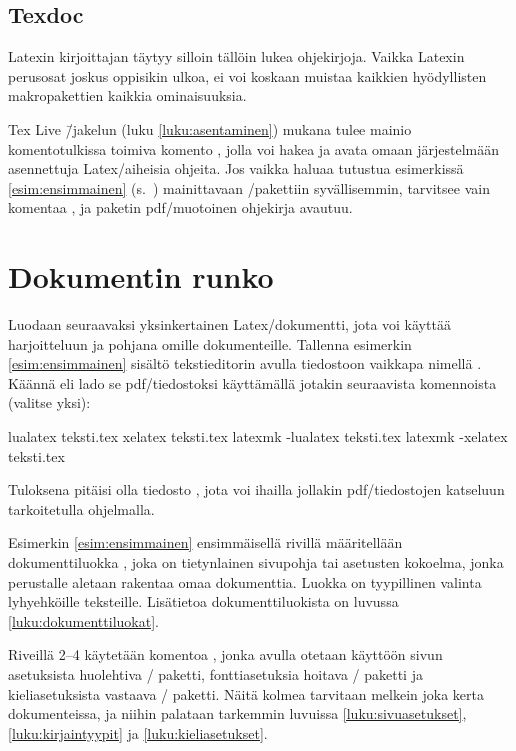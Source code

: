 \subsection{Texdoc}

Latexin kirjoittajan täytyy silloin tällöin lukea ohjekirjoja. Vaikka
Latexin perusosat joskus oppisikin ulkoa, ei voi koskaan muistaa
kaikkien hyödyllisten makropakettien kaikkia ominaisuuksia.

Tex Live \=/jakelun (luku \ref{luku:asentaminen}) mukana tulee mainio
komentotulkissa toimiva komento , jolla voi hakea ja avata
omaan järjestelmään asennettuja Latex\-/aiheisia ohjeita. Jos vaikka
haluaa tutustua esimerkissä \ref{esim:ensimmainen}
(s.~\pageref{esim:ensimmainen}) mainittavaan
\-/pakettiin syvällisemmin, tarvitsee vain komentaa
, ja paketin pdf\-/muotoinen ohjekirja avautuu.

\section{Dokumentin runko}

Luodaan seuraavaksi yksinkertainen Latex\-/dokumentti, jota voi käyttää
harjoitteluun ja pohjana omille dokumenteille. Tallenna esimerkin
\ref{esim:ensimmainen} sisältö tekstieditorin avulla tiedostoon vaikkapa
nimellä . Käännä eli lado se pdf\-/tiedostoksi
käyttämällä jotakin seuraavista komennoista (valitse yksi):

\begin{koodilohkosis}
  lualatex teksti.tex
  xelatex  teksti.tex
  latexmk -lualatex teksti.tex
  latexmk -xelatex  teksti.tex
\end{koodilohkosis}

Tuloksena pitäisi olla tiedosto , jota voi ihailla
jollakin pdf\-/tiedostojen katseluun tarkoitetulla ohjelmalla.

Esimerkin \ref{esim:ensimmainen} ensimmäisellä rivillä määritellään
dokumenttiluokka , joka on tietynlainen sivupohja tai
asetusten kokoelma, jonka perustalle aletaan rakentaa omaa dokumenttia.
Luokka  on tyypillinen valinta lyhyehköille teksteille.
Lisätietoa dokumenttiluokista on luvussa \ref{luku:dokumenttiluokat}.

Riveillä 2--4 käytetään komentoa , jonka avulla
otetaan käyttöön sivun asetuksista huolehtiva \-/
paketti, fontti\-asetuksia hoitava \-/ paketti ja
kieli\-asetuksista vastaava \-/ paketti. Näitä
kolmea tarvitaan melkein joka kerta dokumenteissa, ja niihin palataan
tarkemmin luvuissa \ref{luku:sivuasetukset}, \ref{luku:kirjaintyypit} ja
\ref{luku:kieliasetukset}.

